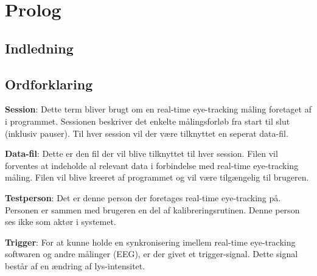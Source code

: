 \documentclass[rapport.tex]{subfiles}
\begin{document}
\section{Prolog}
	\subsection{Indledning}
	\subsection{Ordforklaring}
		\item \textbf{Session}: Dette term bliver brugt om en real-time eye-tracking måling foretaget af i programmet. Sessionen beskriver det enkelte målingsforløb fra start til slut (inklusiv pauser). Til hver session vil der være tilknyttet en seperat data-fil. 
		\item \textbf{Data-fil}: Dette er den fil der vil blive tilknyttet til hver session. Filen vil forventes at indeholde al relevant data i forbindelse med real-time eye-tracking måling. Filen vil blive kreeret af programmet og vil være tilgængelig til brugeren. 
		\item \textbf{Testperson}: Det er denne person der foretages real-time eye-tracking på. Personen er sammen med brugeren en del af kalibreringsrutinen. Denne person ses ikke som aktør i systemet. 
		\item \textbf{Trigger}: For at kunne holde en synkronisering imellem real-time eye-tracking softwaren og andre målinger (EEG), er der givet et trigger-signal. Dette signal består af en ændring af lys-intensitet. 
\end{document}
